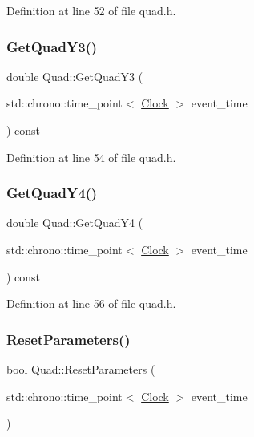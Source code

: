 Definition at line 52 of file quad.\+h.

\mbox{\label{class_quad_a9cdb9ea12e3aa3eb0e471015d4cb46bb}} 
\subsubsection{\texorpdfstring{Get\+Quad\+Y3()}{GetQuadY3()}}
{\footnotesize\ttfamily double Quad\+::\+Get\+Quad\+Y3 (\begin{DoxyParamCaption}\item[{std\+::chrono\+::time\+\_\+point$<$ \hyperlink{universe_8h_a0ef8d951d1ca5ab3cfaf7ab4c7a6fd80}{Clock} $>$}]{event\+\_\+time }\end{DoxyParamCaption}) const\hspace{0.3cm}{\ttfamily [inline]}}



Definition at line 54 of file quad.\+h.

\mbox{\label{class_quad_aff3097e4988549376102daf18b582a0b}} 
\subsubsection{\texorpdfstring{Get\+Quad\+Y4()}{GetQuadY4()}}
{\footnotesize\ttfamily double Quad\+::\+Get\+Quad\+Y4 (\begin{DoxyParamCaption}\item[{std\+::chrono\+::time\+\_\+point$<$ \hyperlink{universe_8h_a0ef8d951d1ca5ab3cfaf7ab4c7a6fd80}{Clock} $>$}]{event\+\_\+time }\end{DoxyParamCaption}) const\hspace{0.3cm}{\ttfamily [inline]}}



Definition at line 56 of file quad.\+h.

\mbox{\label{class_quad_af7c18022d7db1ad20bb7a1e1bd1ffb90}} 
\subsubsection{\texorpdfstring{Reset\+Parameters()}{ResetParameters()}}
{\footnotesize\ttfamily bool Quad\+::\+Reset\+Parameters (\begin{DoxyParamCaption}\item[{std\+::chrono\+::time\+\_\+point$<$ \hyperlink{universe_8h_a0ef8d951d1ca5ab3cfaf7ab4c7a6fd80}{Clock} $>$}]{event\+\_\+time }\end{DoxyParamCaption})}



